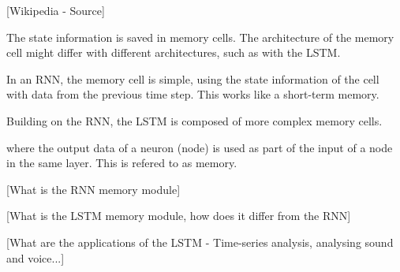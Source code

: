    [Wikipedia - Source]





  The state information is saved in memory cells.
  The architecture of the memory cell might differ with different architectures, such as with the LSTM.

  In an RNN, the memory cell is simple, using the state information of the cell with data from the previous time step.
  This works like a short-term memory.

  Building on the RNN, the LSTM is composed of more complex memory cells.



  where the output data of a neuron (node) is used as part of the input of a node in the same layer.
  This is refered to as memory.

    [What is the RNN memory module]

    [What is the LSTM memory module, how does it differ from the RNN]

    [What are the applications of the LSTM - Time-series analysis, analysing sound and voice...]

\fi
